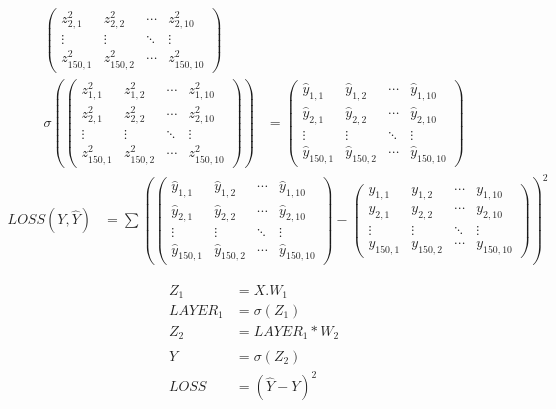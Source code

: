 \documentclass[11pt]{book}
\begin{document}
\begin{footnotesize}
\begin{align*}
\begin{pmatrix}
z^2_{2,1} & z^2_{2,2} & \cdots & z^2_{2,10} \\
\vdots  & \vdots  & \ddots & \vdots  \\
z^2_{150,1} & z^2_{150,2} & \cdots & z^2_{150,10} 
\end{pmatrix}
\\
\sigma(
\begin{pmatrix}
z^2_{1,1} & z^2_{1,2} & \cdots & z^2_{1,10} \\
z^2_{2,1} & z^2_{2,2} & \cdots & z^2_{2,10} \\
\vdots  & \vdots  & \ddots & \vdots  \\
z^2_{150,1} & z^2_{150,2} & \cdots & z^2_{150,10}
\end{pmatrix}
)
&=
\begin{pmatrix}
\hat{y}_{1,1} & \hat{y}_{1,2} & \cdots & \hat{y}_{1,10} \\
\hat{y}_{2,1} & \hat{y}_{2,2} & \cdots & \hat{y}_{2,10} \\
\vdots  & \vdots  & \ddots & \vdots  \\
\hat{y}_{150,1} & \hat{y}_{150,2} & \cdots & \hat{y}_{150,10} 
\end{pmatrix}
\end{align*}
\begin{align*}
LOSS(Y, \hat{Y}) &= \sum (
\begin{pmatrix}
\hat{y}_{1,1} & \hat{y}_{1,2} & \cdots & \hat{y}_{1,10} \\
\hat{y}_{2,1} & \hat{y}_{2,2} & \cdots & \hat{y}_{2,10} \\
\vdots  & \vdots  & \ddots & \vdots  \\
\hat{y}_{150,1} & \hat{y}_{150,2} & \cdots & \hat{y}_{150,10} 
\end{pmatrix}
-
\begin{pmatrix}
y_{1,1} & y_{1,2} & \cdots & y_{1,10} \\
y_{2,1} & y_{2,2} & \cdots & y_{2,10} \\
\vdots  & \vdots  & \ddots & \vdots  \\
y_{150,1} & y_{150,2} & \cdots & y_{150,10} 
\end{pmatrix}
)^2
\end{align*}

\begin{align*}
Z_1 &= X.W_1 \\
LAYER_1 &= \sigma (Z_1) \\
Z_2 &= LAYER_1 * W_2 \\
\hat{Y} &= \sigma (Z_2) \\
LOSS &= (\hat{Y} -Y)^2  
\end{align*}
\end{footnotesize}
\end{document}
